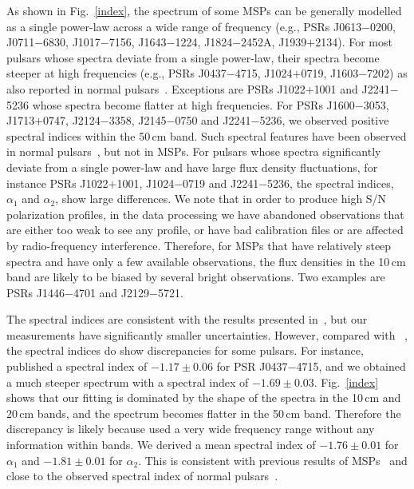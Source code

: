 \documentclass[useAMS,usenatbib]{mn2e}
\begin{document}
As shown in Fig.~\ref{index}, the spectrum of some MSPs can be generally modelled as 
a single power-law across a wide range of frequency (e.g., PSRs J0613$-$0200, J0711$-$6830, 
J1017$-$7156, J1643$-$1224, J1824$-$2452A, J1939$+$2134). 
%
For most pulsars whose spectra deviate from a single power-law, their spectra 
become steeper at high frequencies (e.g., PSRs J0437$-$4715, J1024$+$0719, 
J1603$-$7202) as also reported in normal pulsars~\citep[e.g.,][]{Maron00}.
%
Exceptions are PSRs J1022$+$1001 and J2241$-$5236 whose spectra become flatter at high 
frequencies.
%
For PSRs J1600$-$3053, J1713$+$0747, J2124$-$3358, J2145$-$0750 and J2241$-$5236, we 
observed positive spectral indices within the 50\,cm band. Such spectral features have 
been observed in normal pulsars~\citep[e.g.,][]{Kijak11}, but not in MSPs.
%
For pulsars whose spectra significantly deviate from a single power-law and have large 
flux density fluctuations, for instance PSRs J1022$+$1001, J1024$-$0719  
and J2241$-$5236, the spectral indices, $\alpha_1$ and $\alpha_2$, show large 
differences.
%
We note that in order to produce high S/N polarization profiles, in the data processing 
we have abandoned observations that are either too weak to see any profile, or have bad 
calibration files or are affected by radio-frequency interference. 
%
Therefore, for MSPs that have relatively steep spectra and have only a few available 
observations, the flux densities in the 10\,cm band are likely to be biased by several 
bright observations. Two examples are PSRs J1446$-$4701 and J2129$-$5721.  

The spectral indices are consistent with the results presented in~\citet{Toscano98}, 
but our measurements have significantly smaller uncertainties. However, compared with 
~\citet{Kramer99}, the spectral indices do show discrepancies for some pulsars. 
For instance, \citet{Kramer99} published a spectral index of $-1.17\pm0.06$ for
PSR J0437$-$4715, and we obtained a much steeper spectrum with a spectral index of 
$-1.69\pm0.03$. Fig.~\ref{index} shows that our fitting is dominated by the shape of 
the spectra in the 10\,cm and 20\,cm bands, and the spectrum becomes flatter in the 
50\,cm band. Therefore the discrepancy is likely because \citet{Kramer99} used a 
very wide frequency range without any information within bands. 
%
We derived a mean spectral index of $-1.76\pm0.01$ for $\alpha_1$ and $-1.81\pm0.01$ 
for $\alpha_2$. This is consistent with previous results of MSPs~\citep{Toscano98,Kramer99} 
and close to the observed spectral index of normal pulsars~\citep{Lorimer95,Maron00}. 
%
\end{document}
